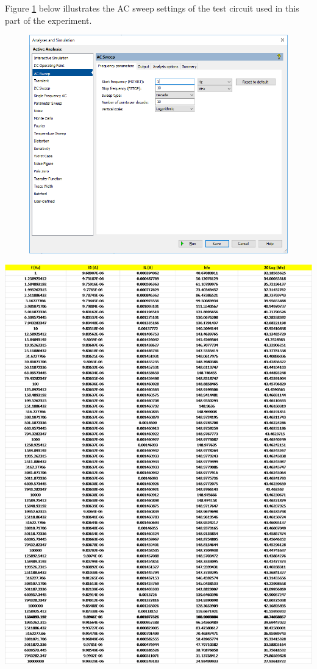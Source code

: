 \documentclass{article}
\begin{document}
	\noindent Figure \ref{f28} below illustrates the AC sweep settings of the test circuit used in this part of the experiment.
	
	\begin{figure}[!ht]
		\centering
		\includegraphics[width=0.6\linewidth]{part4-e-simSettings-2ma.png}
		\label{f28}
	\end{figure}
	
	\pagebreak
	
	\begin{table}[!ht]
		\centering
		\label{t9}
		\includegraphics[width=\linewidth]{part4-e-data-2ma.png}	
	\end{table}
	
\end{document}
